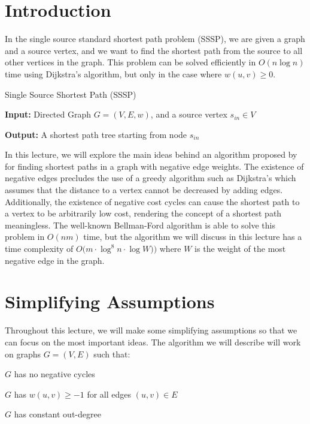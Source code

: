 \documentclass[11pt]{article}
\renewcommand{\sin}{s_{in}}
\newenvironment{tight_enumerate}{
\begin{enumerate}
 \setlength{\itemsep}{2pt}
 \setlength{\parskip}{1pt}
}{\end{enumerate}}
\newenvironment{tight_itemize}{
\begin{itemize}
 \setlength{\itemsep}{2pt}
 \setlength{\parskip}{1pt}
}{\end{itemize}}
\begin{document}
\newcommand{\coursenum}{{CSC 2421H}}
\newcommand{\coursename}{{Graphs, Matrices, and Optimization}}
\newcommand{\courseprof}{Sushant Sachdeva}


\section{Introduction}
In the single source standard shortest path problem (SSSP), we are given a graph and a source vertex, and we want to find the shortest path from the source to all other vertices in the graph. This problem can be solved efficiently in $O(n \log n)$ time using Dijkstra's algorithm, but only in the case where $w(u,v) \geq 0$.

\begin{definition}{Single Source Shortest Path (SSSP)}
    \begin{tight_itemize}
        \item \textbf{Input:} Directed Graph $G = (V,E,w)$, and a source vertex $\sin \in V$
        \item \textbf{Output:} A shortest path tree starting from node $\sin$
    \end{tight_itemize}
    \end{definition}

In this lecture, we will explore the main ideas behind an algorithm proposed by \cite{bernstein2022negative} for finding shortest paths in a graph with negative edge weights. The existence of negative edges precludes the use of a greedy algorithm such as Dijkstra's which assumes that the distance to a vertex cannot be decreased by adding edges. 
Additionally, the existence of negative cost cycles can cause the shortest path to a vertex to be arbitrarily low cost, rendering the concept of a shortest path meaningless.
The well-known Bellman-Ford algorithm is able to solve this problem in $O(nm)$ time, but the algorithm we will discuss in this lecture has a time complexity of $O\big( m  \cdot \log^8 n \cdot \log W ) \big)$ where $W$ is the weight of the most negative edge in the graph.

\section{Simplifying Assumptions}
Throughout this lecture, we will make some simplifying assumptions so that we can focus on the most important ideas. The algorithm we will describe will work on graphs $G = (V, E)$ such that:
\begin{tight_enumerate}
    \item $G$ has no negative cycles
    \item $G$ has $w(u,v) \geq -1$ for all edges $(u,v) \in E$
    \item $G$ has constant out-degree
\end{tight_enumerate}
\end{document}

